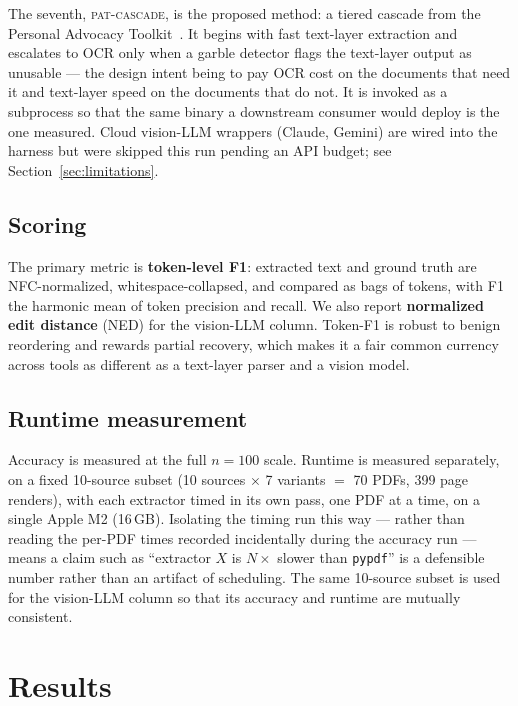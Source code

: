\documentclass[11pt]{article}
\begin{document}
The seventh, \textsc{pat-cascade}, is the proposed method: a
tiered cascade from the Personal Advocacy Toolkit~\cite{pat}. It begins
with fast text-layer extraction and escalates to OCR only when a
garble detector flags the text-layer output as unusable --- the design
intent being to pay OCR cost on the documents that need it and
text-layer speed on the documents that do not. It is invoked as a
subprocess so that the same binary a downstream consumer would deploy is
the one measured. Cloud vision-LLM wrappers (Claude, Gemini) are wired
into the harness but were skipped this run pending an API budget; see
Section~\ref{sec:limitations}.

\subsection{Scoring}
\label{sec:scoring}

The primary metric is \textbf{token-level F1}: extracted text and ground
truth are NFC-normalized, whitespace-collapsed, and compared as bags of
tokens, with F1 the harmonic mean of token precision and recall. We also
report \textbf{normalized edit distance} (NED) for the vision-LLM
column. Token-F1 is robust to benign reordering and rewards partial
recovery, which makes it a fair common currency across tools as
different as a text-layer parser and a vision model.

\subsection{Runtime measurement}
\label{sec:runtimemethod}

Accuracy is measured at the full $n=100$ scale. Runtime is measured
separately, on a fixed 10-source subset (10 sources $\times$ 7 variants
$=$ 70 PDFs, 399 page renders), with each extractor timed in its own
pass, one PDF at a time, on a single Apple M2 (16\,GB). Isolating the
timing run this way --- rather than reading the per-PDF times recorded
incidentally during the accuracy run --- means a claim such as
``extractor $X$ is $N\times$ slower than \texttt{pypdf}'' is a
defensible number rather than an artifact of scheduling. The same
10-source subset is used for the vision-LLM column so that its accuracy
and runtime are mutually consistent.

\section{Results}
\label{sec:results}
\end{document}
